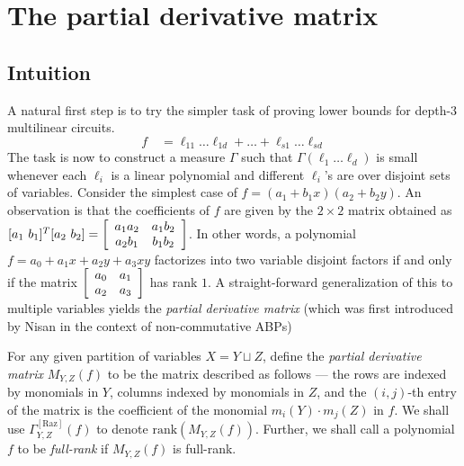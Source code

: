 \section{The partial derivative matrix}
\subsection*{Intuition}

A natural first step is to try the simpler task of proving lower bounds for depth-$3$ multilinear circuits. 
$$
f \quad = \ell_{11} \dots \ell_{1d} + \dots + \ell_{s1}\dots \ell_{sd}
$$
The task is now to construct a measure $\Gamma$ such that $\Gamma(\ell_1\dots \ell_d)$ is small whenever each $\ell_i$ is a linear polynomial and different $\ell_i$'s are over disjoint sets of variables. 
Consider the simplest case of $f = (a_1  + b_1x)(a_2  + b_2y)$. 
An observation is that the coefficients of $f$ are given by the $2\times 2$ matrix obtained as $[a_1\ b_1]^T [a_2\ b_2] = \left[\begin{array}{cc} a_1a_2 & a_1b_2\\ a_2 b_1 & b_1 b_2\end{array}\right]$. 
In other words, a polynomial $f = a_0 + a_1x + a_2y + a_3xy$ factorizes into two variable disjoint factors if and only if the matrix $\left[\begin{array}{cc} a_0 & a_1\\ a_2 & a_3\end{array}\right]$ has rank $1$. 
A straight-forward generalization of this to multiple variables yields the \emph{partial derivative matrix} (which was first introduced by Nisan \cite{nis91} in the context of non-commutative ABPs)\\

\begin{definition}
For any given partition of variables $X = Y \sqcup Z$, define the \emph{partial derivative matrix} $M_{Y,Z}(f)$ to be the matrix described as follows --- the rows are indexed by monomials in $Y$, columns indexed by monomials in $Z$, and the $(i,j)$-th entry of the matrix is the coefficient of the monomial $m_i(Y)\cdot m_j(Z)$ in $f$. 
We shall use $\Gamma^{\mathrm{[Raz]}}_{Y,Z}(f)$ to denote $\mathrm{rank}(M_{Y,Z}(f))$. 
Further, we shall call a polynomial $f$ to be \emph{full-rank} if $M_{Y,Z}(f)$ is full-rank.
\end{definition}


